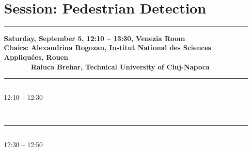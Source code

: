             
            \\ 


\pagebreak
\section{{\bf \large Session: %
Pedestrian Detection
}} \vspace{-15pt} %
\noindent\rule{\textwidth}{0.4pt} \nopagebreak
{\bf  
Saturday, September 5, 12:10 -- 13:30, Venezia Room
} \\ \nopagebreak
{\bf  Chairs: 
Alexandrina Rogozan, Institut National des Sciences Appliqu\'{e}es, Rouen
} \\ \nopagebreak 
{\bf  \textcolor{white}{Chairs:} 
Raluca Brehar, Technical University of Cluj-Napoca
} \\ \nopagebreak 
\noindent\rule{\textwidth}{0.4pt} \nopagebreak

\vspace*{-36pt}\subsection[ 
    	   {\bf Pedestrian Detection in the context of Multiple-Sensor Data Alignment for Far-Infrared and Stereo Vision Sensors
           } \\
           {\it Raluca Brehar, Cristian Cosmin Vancea, Tiberiu Marita, Ion Giosan, Sergiu Nedevschi
           }
	]
	    {
            }
	    12:10 -- 12:30 \nopagebreak

            
            \\ 
            \noindent\rule{\textwidth}{0.4pt}
\vspace*{-36pt}\subsection[ 
    	   {\bf Pedestrian recognition using a dynamic modality fusion approach
           } \\
           {\it Adela-Maria Rus, Alexandrina Rogozan, Laura Diosan, Abdelaziz Bensrhair
           }
	]
	    {
            }
	    12:30 -- 12:50 \nopagebreak


